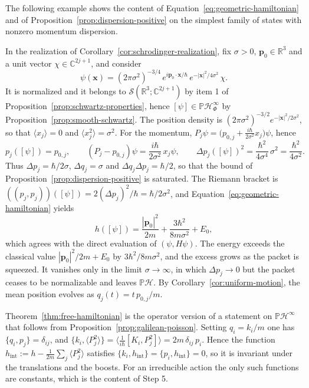 The following example shows the content of Equation~\eqref{eq:geometric-hamiltonian} and of Proposition~\ref{prop:dispersion-positive} on the simplest family of states with nonzero momentum dispersion.

\begin{example}\label{ex:gaussian-packet}
	In the realization of Corollary~\ref{cor:schrodinger-realization}, fix $\sigma>0$, $\mathbf{p}_0\in\mathbb{R}^3$ and a unit vector $\chi\in\mathbb{C}^{2j+1}$, and consider
	\begin{equation*}
		\psi(\mathbf{x})=(2\pi\sigma^2)^{-3/4}\,e^{i\mathbf{p}_0\cdot\mathbf{x}/\hbar}\,e^{-|\mathbf{x}|^2/4\sigma^2}\,\chi.
	\end{equation*}
	It is normalized and it belongs to $\mathcal{S}(\mathbb{R}^3;\mathbb{C}^{2j+1})$ by item 1 of Proposition~\ref{prop:schwartz-properties}, hence $[\psi]\in\mathbb{P}\mathcal{H}^\infty_\Phi$ by Proposition~\ref{prop:smooth-schwartz}. The position density is $(2\pi\sigma^2)^{-3/2}e^{-|\mathbf{x}|^2/2\sigma^2}$, so that $\langle x_j\rangle=0$ and $\langle x_j^2\rangle=\sigma^2$. For the momentum, $P_j\psi=\big(p_{0,j}+\tfrac{i\hbar}{2\sigma^2}x_j\big)\psi$, hence
	\begin{equation*}
		p_j([\psi])=p_{0,j},\qquad (P_j-p_{0,j})\psi=\frac{i\hbar}{2\sigma^2}\,x_j\psi,\qquad \Delta p_j([\psi])^2=\frac{\hbar^2}{4\sigma^4}\,\sigma^2=\frac{\hbar^2}{4\sigma^2}.
	\end{equation*}
	Thus $\Delta p_j=\hbar/2\sigma$, $\Delta q_j=\sigma$ and $\Delta q_j\Delta p_j=\hbar/2$, so that the bound of Proposition~\ref{prop:dispersion-positive} is saturated. The Riemann bracket is $((p_j,p_j))([\psi])=2(\Delta p_j)^2/\hbar=\hbar/2\sigma^2$, and Equation~\eqref{eq:geometric-hamiltonian} yields
	\begin{equation*}
		h([\psi])=\frac{|\mathbf{p}_0|^2}{2m}+\frac{3\hbar^2}{8m\sigma^2}+E_0,
	\end{equation*}
	which agrees with the direct evaluation of $(\psi,H\psi)$. The energy exceeds the classical value $|\mathbf{p}_0|^2/2m+E_0$ by $3\hbar^2/8m\sigma^2$, and the excess grows as the packet is squeezed. It vanishes only in the limit $\sigma\to\infty$, in which $\Delta p_j\to0$ but the packet ceases to be normalizable and leaves $\mathbb{P}\mathcal{H}$. By Corollary~\ref{cor:uniform-motion}, the mean position evolves as $q_j(t)=t\,p_{0,j}/m$.
\end{example}

\begin{remark}\label{rem:poisson-shadow}
	Theorem~\ref{thm:free-hamiltonian} is the operator version of a statement on $\mathbb{P}\mathcal{H}^\infty$ that follows from Proposition~\ref{prop:galilean-poisson}. Setting $q_i=k_i/m$ one has $\{q_i,p_j\}=\delta_{ij}$, and $\{k_i,\langle P_j^2\rangle\}=\langle\tfrac{1}{i\hbar}[K_i,P_j^2]\rangle=2m\,\delta_{ij}\,p_i$. Hence the function $h_{\mathrm{int}}:=h-\tfrac{1}{2m}\sum_j\langle P_j^2\rangle$ satisfies $\{k_i,h_{\mathrm{int}}\}=\{p_i,h_{\mathrm{int}}\}=0$, so it is invariant under the translations and the boosts. For an irreducible action the only such functions are constants, which is the content of Step 5.
\end{remark}

